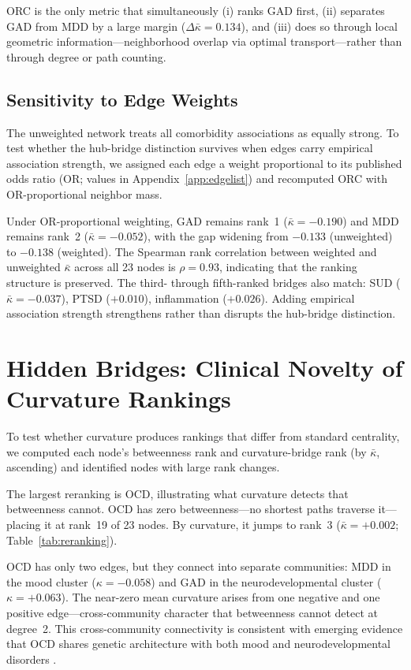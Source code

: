 \documentclass{article}
\begin{document}
ORC is the only metric that simultaneously (i) ranks GAD first, (ii) separates GAD from MDD by a large margin ($\Delta\bar\kappa = 0.134$), and (iii) does so through local geometric information---neighborhood overlap via optimal transport---rather than through degree or path counting.

\subsection{Sensitivity to Edge Weights}
\label{sec:weighted}

The unweighted network treats all comorbidity associations as equally strong. To test whether the hub-bridge distinction survives when edges carry empirical association strength, we assigned each edge a weight proportional to its published odds ratio (OR; values in Appendix~\ref{app:edgelist}) and recomputed ORC with OR-proportional neighbor mass.

Under OR-proportional weighting, GAD remains rank~1 ($\bar\kappa = -0.190$) and MDD remains rank~2 ($\bar\kappa = -0.052$), with the gap widening from $-0.133$ (unweighted) to $-0.138$ (weighted). The Spearman rank correlation between weighted and unweighted $\bar\kappa$ across all 23 nodes is $\rho = 0.93$, indicating that the ranking structure is preserved. The third- through fifth-ranked bridges also match: SUD ($\bar\kappa = -0.037$), PTSD ($+0.010$), inflammation ($+0.026$). Adding empirical association strength strengthens rather than disrupts the hub-bridge distinction.

\section{Hidden Bridges: Clinical Novelty of Curvature Rankings}
\label{sec:novelty}

To test whether curvature produces rankings that differ from standard centrality, we computed each node's betweenness rank and curvature-bridge rank (by $\bar\kappa$, ascending) and identified nodes with large rank changes.

The largest reranking is OCD, illustrating what curvature detects that betweenness cannot. OCD has zero betweenness---no shortest paths traverse it---placing it at rank~19 of 23 nodes. By curvature, it jumps to rank~3 ($\bar\kappa = +0.002$; Table~\ref{tab:reranking}).

OCD has only two edges, but they connect into separate communities: MDD in the mood cluster ($\kappa = -0.058$) and GAD in the neurodevelopmental cluster ($\kappa = +0.063$). The near-zero mean curvature arises from one negative and one positive edge---cross-community character that betweenness cannot detect at degree~2. This cross-community connectivity is consistent with emerging evidence that OCD shares genetic architecture with both mood and neurodevelopmental disorders \citep{ocd_cross_disorder2019}.
\end{document}
